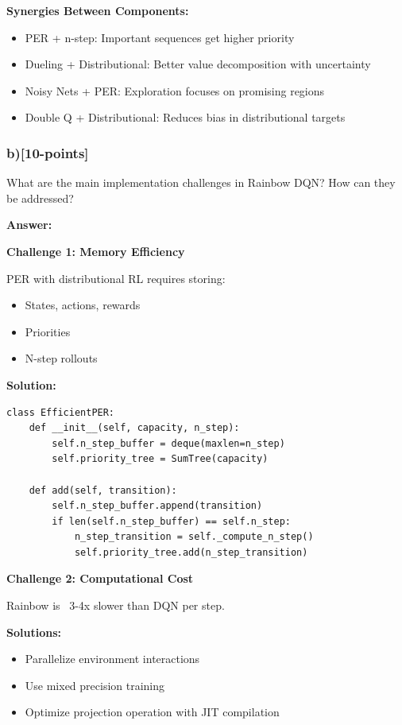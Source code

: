 \documentclass[12pt]{article}
\begin{document}
{{\textbf{Synergies Between Components:}
\begin{itemize}
\item PER + n-step: Important sequences get higher priority
\item Dueling + Distributional: Better value decomposition with uncertainty
\item Noisy Nets + PER: Exploration focuses on promising regions
\item Double Q + Distributional: Reduces bias in distributional targets
\end{itemize}

\subsubsection{b)[10-points]} What are the main implementation challenges in Rainbow DQN? How can they be addressed?

\textbf{Answer:}

\textbf{Challenge 1: Memory Efficiency}

PER with distributional RL requires storing:
\begin{itemize}
\item States, actions, rewards
\item Priorities
\item N-step rollouts
\end{itemize}

\textbf{Solution:}
\begin{verbatim}
class EfficientPER:
    def __init__(self, capacity, n_step):
        self.n_step_buffer = deque(maxlen=n_step)
        self.priority_tree = SumTree(capacity)
    
    def add(self, transition):
        self.n_step_buffer.append(transition)
        if len(self.n_step_buffer) == self.n_step:
            n_step_transition = self._compute_n_step()
            self.priority_tree.add(n_step_transition)
\end{verbatim}

\textbf{Challenge 2: Computational Cost}

Rainbow is ~3-4x slower than DQN per step.

\textbf{Solutions:}
\begin{itemize}
\item Parallelize environment interactions
\item Use mixed precision training
\item Optimize projection operation with JIT compilation
\end{itemize}

}}
\end{document}
